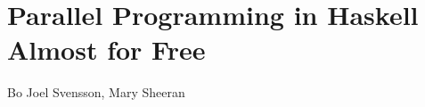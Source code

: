\documentclass[a4paper]{book}
\begin{document}
\section{Parallel Programming in Haskell Almost for Free}
\label{sec:paper8}

\begin{center} 
Bo Joel Svensson, Mary Sheeran
\end{center}





\cleardoublepage




\end{document}
